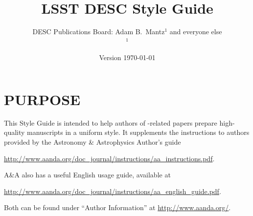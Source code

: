 \documentclass[letterpaper,11pt]{article}
\newcommand*{\version}{Version \today}
\begin{document}

\title{\vspace{5cm}LSST DESC Style Guide}
\author{DESC Publications Board: Adam B.\ Mantz$^1$ and everyone else
  \smallskip\\{\small
    $^1$\suphysics
}}
\date{\version}
\maketitle
\thispagestyle{fancy}

\clearpage
\fancyhead{}
\fancyhead[L]{\version}
\fancyhead[R]{\thepage}
\setcounter{page}{1}

\tableofcontents

\clearpage
\fancyhead[C]{\rightmark}
\setcounter{page}{1}

\section{PURPOSE}

This Style Guide is intended to help authors of \Planck-related papers prepare
high-quality manuscripts in a uniform style. It supplements the instructions
to authors provided by the  Astronomy \& Astrophysics Author's guide 

\url{http://www.aanda.org/doc_journal/instructions/aa_instructions.pdf}.

\noindent A\&A also has a useful English usage guide, available at 

\url{http://www.aanda.org/doc_journal/instructions/aa_english_guide.pdf}.

\noindent Both can be found under ``Author Information'' at
\url{http://www.aanda.org/}.

%
%
\end{document}
